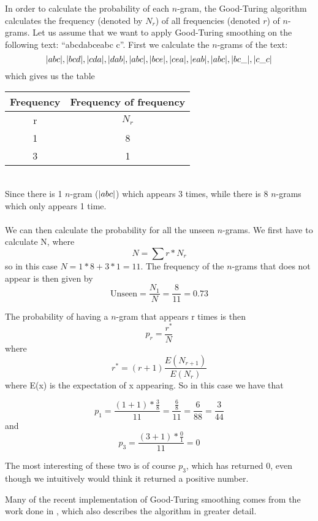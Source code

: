 In order to calculate the probability of each $n$-gram, the Good-Turing algorithm calculates the frequency (denoted by $N_r$) of all frequencies (denoted $r$) of $n$-grams. Let us assume that we want to apply Good-Turing smoothing on the following text: ``abcdabceabc c''. First we calculate the $n$-grams of the text:\\
$$
|abc|, |bcd|, |cda|, |dab|, |abc|, |bce|, |cea|, |eab|, |abc|, |bc\_|, |c\_c|
$$
which gives us the table\\
\begin{tabular}{|cc|}
\hline
Frequency & Frequency of frequency \\
\hline
r & $N_{r}$ \\
1 & 8\\
3 & 1\\
\hline
\end{tabular}\\
Since there is 1 $n$-gram ($|abc|$) which appears 3 times, while there is 8 $n$-grams which only appears 1 time. 
\\\\
We can then calculate the probability for all the unseen $n$-grams. We first have to calculate N, where 
$$
N = \sum r * N_r
$$
so in this case $N = 1 * 8 + 3 * 1 = 11$. The frequency of the $n$-grams that does not appear is then given by 
$$
\mathrm{Unseen} = \frac{N_1}{N} = \frac{8}{11} = 0.73
$$

The probability of having a $n$-gram that appears r times is then 
$$p_r = \frac{r^*}{N}$$
 where 
$$r^* = (r+1)\frac{E(N_{r+1})}{E(N_r)}$$
 where E(x) is the expectation of x appearing. So in this case we have that 

$$p_1 = \frac{(1 + 1) * \frac{3}{8}}{11} = \frac{\frac{6}{8}}{11} = \frac{6}{88} = \frac{3}{44}$$ and  
$$p_3 = \frac{(3 + 1) * \frac{0}{1}}{11} = 0$$

The most interesting of these two is of course $p_3$, which has returned 0, even though we intuitively would think it returned a positive number.

Many of the recent implementation of Good-Turing smoothing comes from the work done in \cite{Gale94good-turingsmoothing}, which also describes the algorithm in greater detail.
